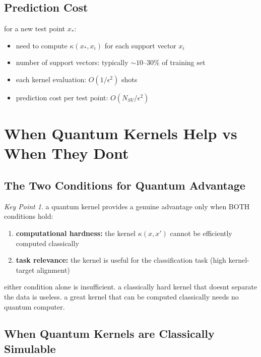 \documentclass[11pt,a4paper]{article}
\theoremstyle{definition}
\theoremstyle{remark}
\newtheorem*{keypoint}{Key Point}
\begin{document}
\subsection{Prediction Cost}

for a new test point $x_*$:
\begin{itemize}
    \item need to compute $\kappa(x_*, x_i)$ for each support vector $x_i$
    \item number of support vectors: typically $\sim 10$--$30\%$ of training set
    \item each kernel evaluation: $O(1/\epsilon^2)$ shots
    \item prediction cost per test point: $O(N_{SV}/\epsilon^2)$
\end{itemize}

\section{When Quantum Kernels Help vs When They Dont}

\subsection{The Two Conditions for Quantum Advantage}

\begin{keypoint}
a quantum kernel provides a genuine advantage only when BOTH conditions hold:
\begin{enumerate}
    \item \textbf{computational hardness:} the kernel $\kappa(x,x')$ cannot be efficiently computed classically
    \item \textbf{task relevance:} the kernel is useful for the classification task (high kernel-target alignment)
\end{enumerate}
either condition alone is insufficient. a classically hard kernel that doesnt separate the data is useless. a great kernel that can be computed classically needs no quantum computer.
\end{keypoint}

\subsection{When Quantum Kernels are Classically Simulable}
\end{document}
